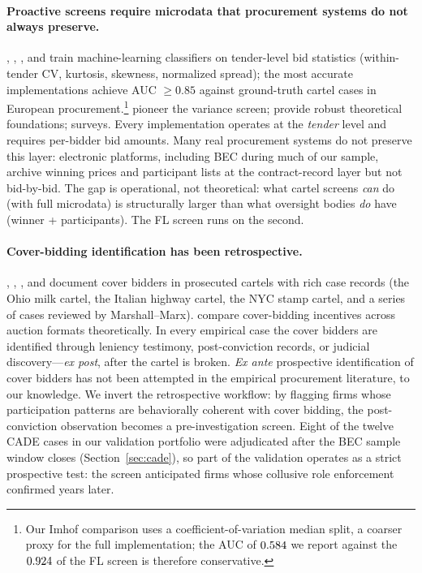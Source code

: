\paragraph{Proactive screens require microdata that procurement
systems do not always preserve.} \citet{imhof2019detecting},
\citet{imhof2018screening}, \citet{huber2019machine}, and
\citet{wallimann2023machine} train machine-learning classifiers
on tender-level bid statistics (within-tender CV, kurtosis,
skewness, normalized spread); the most accurate implementations
achieve AUC $\geq 0.85$ against ground-truth cartel cases in
European procurement.\footnote{Our Imhof comparison uses a
coefficient-of-variation median split, a coarser proxy for the
full implementation; the AUC of $0.584$ we report against the
$0.924$ of the FL screen is therefore conservative.}
\citet{abrantesmetz2006a} pioneer the variance screen;
\citet{chassang2022robust} provide robust theoretical
foundations; \citet{harrington2008detecting} surveys.
Every implementation operates at the \emph{tender} level and
requires per-bidder bid amounts. Many real procurement systems
do not preserve this layer: electronic platforms, including BEC
during much of our sample, archive winning prices and
participant lists at the contract-record layer but not bid-by-bid.
The gap is operational, not theoretical: what cartel screens
\emph{can} do (with full microdata) is structurally larger than
what oversight bodies \emph{do} have (winner + participants).
The FL screen runs on the second.

\paragraph{Cover-bidding identification has been retrospective.}
\citet{porter1999ohio}, \citet{pesendorfer2000study},
\citet{asker2010leniency}, and \citet{marshall2012economics}
document cover bidders in prosecuted cartels with rich case
records (the Ohio milk cartel, the Italian highway cartel, the
NYC stamp cartel, and a series of cases reviewed by
Marshall--Marx). \citet{athey2011comparing} compare cover-bidding
incentives across auction formats theoretically. In every
empirical case the cover bidders are identified through
leniency testimony, post-conviction records, or judicial
discovery---\emph{ex post}, after the cartel is broken.
\emph{Ex ante} prospective identification of cover bidders has
not been attempted in the empirical procurement literature, to
our knowledge. We invert the retrospective workflow: by flagging
firms whose participation patterns are behaviorally coherent
with cover bidding, the post-conviction observation becomes a
pre-investigation screen. Eight of the twelve CADE cases in our
validation portfolio were adjudicated after the BEC sample
window closes (Section~\ref{sec:cade}), so part of the
validation operates as a strict prospective test: the screen
anticipated firms whose collusive role enforcement confirmed
years later.

